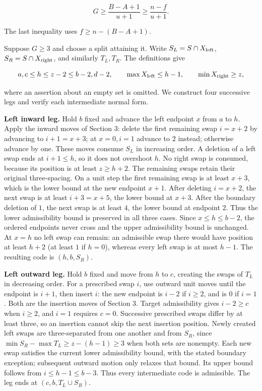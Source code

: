 \documentclass[11pt,a4paper]{article}
\begin{document}
\[ G\ge\frac{B-A+1}{u+1}\ge\frac{n-f}{u+1}. \tag{1} \]

The last inequality uses \(f\ge n-(B-A+1)\).

Suppose \(G\ge3\) and choose a split attaining it. Write \(S_L=S\cap X_{\rm left}\), \(S_R=S\cap X_{\rm right}\), and similarly \(T_L,T_R\). The definitions give

\[ a,c\le h\le z-2\le b-2,d-2,\qquad
\max X_{\rm left}\le h-1,\qquad \min X_{\rm right}\ge z, \]

where an assertion about an empty set is omitted. We construct four successive legs and verify each intermediate normal form.

\textbf{Left inward leg.} Hold \(b\) fixed and advance the left endpoint \(x\) from \(a\) to \(h\). Apply the inward moves of Section 3: delete the first remaining swap \(i=x+2\) by advancing to \(i+1=x+3\); at \(x=0,i=1\) advance to \(2\) instead; otherwise advance by one. These moves consume \(S_L\) in increasing order. A deletion of a left swap ends at \(i+1\le h\), so it does not overshoot \(h\). No right swap is consumed, because its position is at least \(z\ge h+2\). The remaining swaps retain their original three-spacing. On a unit step the first remaining swap is at least \(x+3\), which is the lower bound at the new endpoint \(x+1\). After deleting \(i=x+2\), the next swap is at least \(i+3=x+5\), the lower bound at \(x+3\). After the boundary deletion of \(1\), the next swap is at least \(4\), the lower bound at endpoint \(2\). Thus the lower admissibility bound is preserved in all three cases. Since \(x\le h\le b-2\), the ordered endpoints never cross and the upper admissibility bound is unchanged. At \(x=h\) no left swap can remain: an admissible swap there would have position at least \(h+2\) (at least \(1\) if \(h=0\)), whereas every left swap is at most \(h-1\). The resulting code is \((h,b,S_R)\).

\textbf{Left outward leg.} Hold \(b\) fixed and move from \(h\) to \(c\), creating the swaps of \(T_L\) in decreasing order. For a prescribed swap \(i\), use outward unit moves until the endpoint is \(i+1\), then insert \(i\): the new endpoint is \(i-2\) if \(i\ge2\), and is \(0\) if \(i=1\). Both are the insertion moves of Section 3. Target admissibility gives \(i-2\ge c\) when \(i\ge2\), and \(i=1\) requires \(c=0\). Successive prescribed swaps differ by at least three, so an insertion cannot skip the next insertion position. Newly created left swaps are three-separated from one another and from \(S_R\), since \(\min S_R-\max T_L\ge z-(h-1)\ge3\) when both sets are nonempty. Each new swap satisfies the current lower admissibility bound, with the stated boundary exception; subsequent outward motion only relaxes that bound. Its upper bound follows from \(i\le h-1\le b-3\). Thus every intermediate code is admissible. The leg ends at \((c,b,T_L\cup S_R)\).
\end{document}

